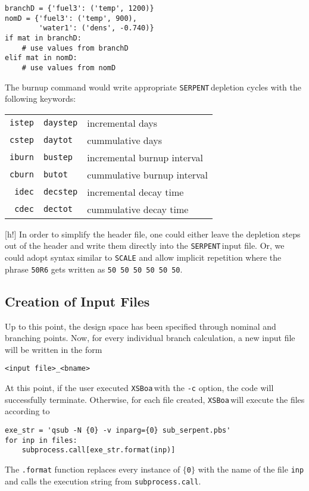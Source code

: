 \documentclass{article}
\newcommand{\boa}{\texttt{XSBoa}\,}
\newcommand{\serp}{\texttt{SERPENT}\,}
\begin{document}
\begin{lstlisting}
branchD = {'fuel3': ('temp', 1200)}
nomD = {'fuel3': ('temp', 900), 
        'water1': ('dens', -0.740)}
if mat in branchD:
	# use values from branchD
elif mat in nomD:
	# use values from nomD
\end{lstlisting}

The burnup command would write appropriate \serp depletion cycles with the following keywords:
\begin{table}[h!]
\begin{tabular}{r|ll}
	\texttt{istep} & \texttt{daystep} & incremental days \\
	\texttt{cstep} & \texttt{daytot} & cummulative days \\
	\texttt{iburn} & \texttt{bustep} & incremental burnup interval \\
	\texttt{cburn} & \texttt{butot} & cummulative burnup interval \\
	\texttt{idec} & \texttt{decstep} & incremental decay time \\
	\texttt{cdec} & \texttt{dectot} & cummulative decay time \\
\end{tabular}
\end{table}[h!]
In order to simplify the header file, one could either leave the depletion steps out of the header and write them directly into the \serp input file.
Or, we could adopt syntax similar to \texttt{SCALE} and allow implicit repetition where the phrase \texttt{50R6} gets written as \texttt{50 50 50 50 50 50}.

\subsection{Creation of Input Files} \label{sec:create}
Up to this point, the design space has been specified through nominal and branching points.
Now, for every individual branch calculation, a new input file will be written in the form 
\begin{lstlisting}
<input file>_<bname>
\end{lstlisting}

At this point, if the user executed \boa with the \texttt{-c} option, the code will successfully terminate.
Otherwise, for each file created, \boa will execute the files according to
\begin{lstlisting}
exe_str = 'qsub -N {0} -v inparg={0} sub_serpent.pbs'
for inp in files:
	subprocess.call[exe_str.format(inp)]
\end{lstlisting}
The \texttt{.format} function replaces every instance of \texttt{$\lbrace$0$\rbrace$} with the name of the file \texttt{inp} and calls the execution string from \texttt{subprocess.call}.
\end{document}
